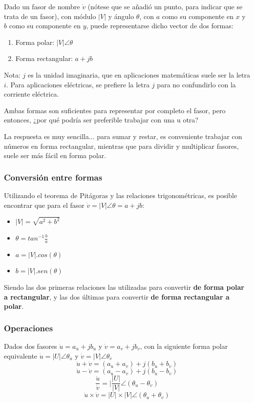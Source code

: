 Dado un fasor de nombre $\dot{v}$ (nótese que se añadió un punto, para indicar que se trata de un fasor), con módulo $|V|$ y ángulo $\theta$, con $a$ como su componente en $x$ y $b$ como su componente en $y$, puede representarse dicho vector de dos formas:

\begin{enumerate}
	\item Forma polar: $|V| \angle \theta$
	\item Forma rectangular: $a+jb$
\end{enumerate}

Nota: $j$ es la unidad imaginaria, que en aplicaciones matemáticas suele ser la letra $i$. Para aplicaciones eléctricas, se prefiere la letra $j$ para no confundirlo con la corriente eléctrica.

Ambas formas son suficientes para representar por completo el fasor, pero entonces, ¿por qué podría ser preferible trabajar con una u otra? 

La respuesta es muy sencilla... para sumar y restar, es conveniente trabajar con números en forma rectangular, mientras que para dividir y multiplicar fasores, suele ser más fácil en forma polar.

\subsubsection{Conversión entre formas}

Utilizando el teorema de Pitágoras y las relaciones trigonométricas, es posible encontrar que para el fasor $\dot{v}=|V| \angle \theta=a+jb$:
\begin{itemize}
	\item $|V|=\sqrt{a^{2}+b^{2}}$
	\item $\theta = tan^{-1}\frac{b}{a}$
	\item $a=|V|.cos(\theta)$
	\item $b=|V|.sen(\theta)$
\end{itemize}

Siendo las dos primeras relaciones las utilizadas para convertir \textbf{de forma polar a rectangular}, y las dos últimas para convertir \textbf{de forma rectangular a polar}.

\subsubsection{Operaciones}

Dados dos fasores $\dot{u}=a_u+jb_u$ y $\dot{v}=a_v+jb_v$, con la siguiente forma polar equivalente $\dot{u}=|U| \angle \theta_u$ y  $\dot{v}=|V| \angle \theta_v$
$$\dot{u}+\dot{v}= (a_u+a_v)+j(b_u+b_v)$$
$$\dot{u}-\dot{v}= (a_u-a_v)+j(b_u-b_v)$$
$$\frac{\dot{u}}{\dot{v}}=|\frac{|U|}{|V|} \angle (\theta_u - \theta_v )$$
$$\dot{u}\times \dot{v}=|U| \times |V| \angle (\theta_u + \theta_v )$$

